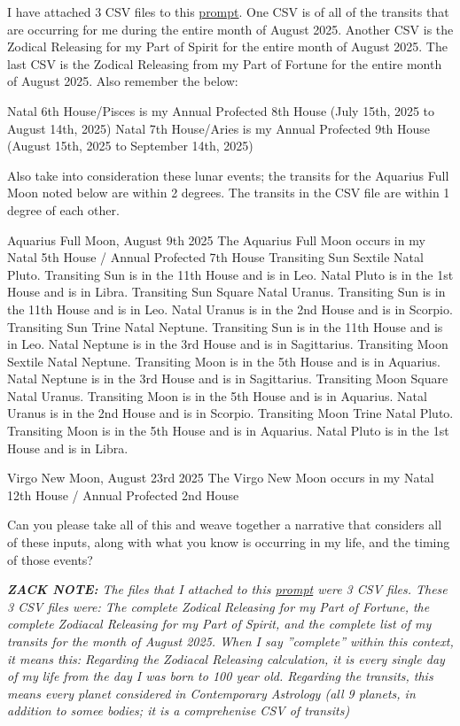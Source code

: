 \documentclass{article}
\begin{document}
I have attached 3 CSV files to this \hyperlink{gloss:prompt}{prompt}. One CSV is of all of the transits that are occurring for me during the entire month of August 2025. Another CSV is the Zodical Releasing for my Part of Spirit for the entire month of August 2025. The last CSV is the Zodical Releasing from my Part of Fortune for the entire month of August 2025. Also remember the below:

Natal 6th House/Pisces is my Annual Profected 8th House (July 15th, 2025 to August 14th, 2025) Natal 7th House/Aries is my Annual Profected 9th House (August 15th, 2025 to September 14th, 2025)

Also take into consideration these lunar events; the transits for the Aquarius Full Moon noted below are within 2 degrees. The transits in the CSV file are within 1 degree of each other.

Aquarius Full Moon, August 9th 2025 The Aquarius Full Moon occurs in my Natal 5th House / Annual Profected 7th House Transiting Sun Sextile Natal Pluto. Transiting Sun is in the 11th House and is in Leo. Natal Pluto is in the 1st House and is in Libra. Transiting Sun Square Natal Uranus. Transiting Sun is in the 11th House and is in Leo. Natal Uranus is in the 2nd House and is in Scorpio. Transiting Sun Trine Natal Neptune. Transiting Sun is in the 11th House and is in Leo. Natal Neptune is in the 3rd House and is in Sagittarius. Transiting Moon Sextile Natal Neptune. Transiting Moon is in the 5th House and is in Aquarius. Natal Neptune is in the 3rd House and is in Sagittarius. Transiting Moon Square Natal Uranus. Transiting Moon is in the 5th House and is in Aquarius. Natal Uranus is in the 2nd House and is in Scorpio. Transiting Moon Trine Natal Pluto. Transiting Moon is in the 5th House and is in Aquarius. Natal Pluto is in the 1st House and is in Libra.

Virgo New Moon, August 23rd 2025 The Virgo New Moon occurs in my Natal 12th House / Annual Profected 2nd House

Can you please take all of this and weave together a narrative that considers all of these inputs, along with what you know is occurring in my life, and the timing of those events?

\emph{\textbf{ZACK NOTE:} The files that I attached to this \hyperlink{gloss:prompt}{prompt} were 3 CSV files. These 3 CSV files were: The complete Zodical Releasing for my Part of Fortune, the complete Zodiacal Releasing for my Part of Spirit, and the complete list of my transits for the month of August 2025. When I say ”complete” within this context, it means this: Regarding the Zodiacal Releasing calculation, it is every single day of my life from the day I was born to 100 year old. Regarding the transits, this means every planet considered in Contemporary Astrology (all 9 planets, in addition to somee bodies; it is a comprehenise CSV of transits)}
\end{document}
